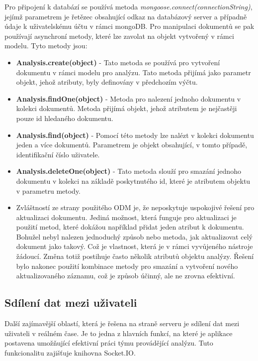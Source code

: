 Pro připojení k databází se používá metoda \textit{mongoose.connect(connectionString)}, jejímž parametrem je řetězec obsahující odkaz na databázový server a případně údaje k uživatelskému účtu v rámci mongoDB. 
Pro manipulaci dokumentů se pak používají asynchroní metody, které lze zavolat na objekt vytvořený v rámci modelu. Tyto metody jsou: 
    
\begin{itemize}
    \item \textbf{Analysis.create(object)} - Tato metoda se používá pro vytvoření dokumentu v rámci modelu pro analýzu. Tato metoda přijímá jako parametr objekt, jehož atributy, byly definovány v předchozím výčtu. 
    \item \textbf{Analysis.findOne(object)} - Metoda pro nalezení jednoho dokumentu v kolekci dokumentů. Metoda přijímá objekt, jehož atributem je nejčastěji pouze id hledaného dokumentu. 
    \item \textbf{Analysis.find(object)} - Pomocí této metody lze nalézt v kolekci dokumentu jeden a více dokumentů. Parametrem je objekt obsahující, v tomto případě, identifikační číslo uživatele.   
    \item \textbf{Analysis.deleteOne(object)} - Tato metoda slouží pro smazání jednoho dokumentu v kolekci na základě poskytnutého id, které je atributem objektu v parametru metody. 
    \item Zvláštností ze strany použitého ODM je, že neposkytuje uspokojivé řešení pro aktualizaci dokumentu. Jediná možnost, která funguje pro aktualizaci je použití metod, které dokážou například přidat jeden atribut k dokumentu. Bohužel nebyl nalezen jednoduchý způsob nebo metoda, jak aktualizovat celý dokument jako takový. Což je vlastnost, která je v rámci vyvůjeného nástroje žádoucí. Změna totiž postihuje často několik atributů objektu analýzy. Řešení bylo nakonec použití kombinace metody pro smazání a vytvoření nového aktualizovaného záznamu, což je způsob účinný, ale ne zrovna efektivní.  
\end{itemize}

\subsection{Sdílení dat mezi uživateli}
Další zajímavější oblastí, která je řešena na straně serveru je sdílení dat mezi uživateli v reálném čase. Je to jedna z hlavních funkcí, na které je aplikace postavena umožňující efektivní práci týmu provádějící analýzu. Tuto funkcionalitu zajišťuje knihovna Socket.IO. 

